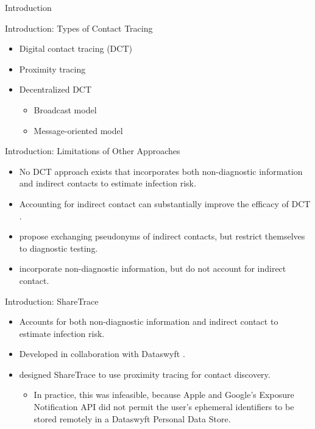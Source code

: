 \documentclass[12pt]{beamer}
\begin{document}
\begin{frame}
	\maketitle
\end{frame}

\begin{section}{Introduction}

\begin{frame}{Introduction: Types of Contact Tracing}
  \begin{itemize}
    \item Digital contact tracing (DCT)
    \item Proximity tracing
    \item Decentralized DCT
      \begin{itemize}
        \item Broadcast model
        \item Message-oriented model
      \end{itemize}
  \end{itemize}
\end{frame}

\begin{frame}{Introduction: Limitations of Other Approaches}
  \begin{itemize}
    \item No DCT approach exists that incorporates both non-diagnostic information and indirect contacts to estimate infection risk.
    \item Accounting for indirect contact can substantially improve the efficacy of DCT \citep{PozoMartin2023}.
    \item \citet{Cherini2023} propose exchanging pseudonyms of indirect contacts, but restrict themselves to diagnostic testing.
    \item \citet{Gupta2023} incorporate non-diagnostic information, but do not account for indirect contact.
  \end{itemize}
\end{frame}

\begin{frame}{Introduction: ShareTrace}
  \begin{itemize}
    \item Accounts for both non-diagnostic information and indirect contact to estimate infection risk.
    \item Developed in collaboration with Dataswyft \citep{Ayday2020}. 
    \item \citet{Ayday2021} designed ShareTrace to use proximity tracing for contact discovery.
      \begin{itemize}
        \item In practice, this was infeasible, because Apple and Google's Exposure Notification API did not permit the user's ephemeral identifiers to be stored remotely in a Dataswyft Personal Data Store.
      \end{itemize}
  \end{itemize}
\end{frame}
\end{section}
\end{document}
